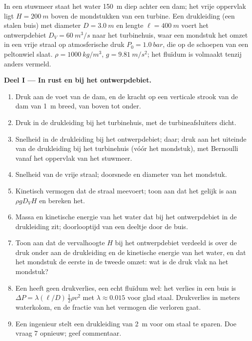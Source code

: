 \begin{problem}
\label{pb:b2:euler-bernoulli:1}

In een stuwmeer staat het water \qty{150}{m} diep achter een dam; het vrije
oppervlak ligt $H = \qty{200}{m}$ boven de mondstukken van een turbine. Een
drukleiding (een stalen buis) met diameter $D = \qty{3.0}{m}$ en lengte
$\ell = \qty{400}{m}$ voert het ontwerpdebiet $D_V = \qty{60}{m^3/s}$ naar
het turbinehuis, waar een mondstuk het omzet in een vrije straal op
atmosferische druk $P_0 =
\qty{1.0}{bar}$, die op de schoepen van een
peltonwiel slaat. $\rho =
\qty{1000}{kg/m^3}$, $g = \qty{9.81}{m/s^2}$; het
fluïdum is volmaakt tenzij anders vermeld.

\medskip
\noindent\textbf{Deel I --- In rust en bij het ontwerpdebiet.}
\begin{enumerate}
  \item Druk aan de voet van de dam, en de kracht op een verticale strook
        van de dam van \qty{1}{m} breed, van boven tot onder.
  \item Druk in de drukleiding bij het turbinehuis, met de turbineafsluiters dicht.
  \item Snelheid in de drukleiding bij het ontwerpdebiet; 
        daar; druk aan het uiteinde van de drukleiding bij het turbinehuis
        (vóór het mondstuk), met Bernoulli vanaf het oppervlak van het
        stuwmeer.
  \item Snelheid van de vrije straal; doorsnede en diameter van het mondstuk.
  \item Kinetisch vermogen dat de straal meevoert; toon aan dat het gelijk
        is aan $\rho gD_VH$ en bereken het.
  \item Massa en kinetische energie van het water dat bij het ontwerpdebiet
        in de drukleiding zit; doorlooptijd van een deeltje door de buis.
  \item Toon aan dat de vervalhoogte $H$ bij het ontwerpdebiet verdeeld is
        over de druk onder aan de drukleiding en de kinetische energie van
        het water, en dat het mondstuk de eerste in de tweede omzet: wat is
        de druk vlak na het mondstuk?
  \item Een  heeft geen drukverlies, een echt fluïdum wel:
        het verlies in een buis is
        $\Delta P = \lambda(\ell/D)\,\tfrac12\rho v^2$ met
        $\lambda
        \approx 0.015$ voor glad staal. Drukverlies in meters
        waterkolom, en de fractie van het vermogen die verloren gaat.
  \item Een ingenieur stelt een drukleiding van \qty{2}{m} voor om staal te
        sparen. Doe vraag 7 opnieuw; geef commentaar.
\end{enumerate}


\end{problem}
